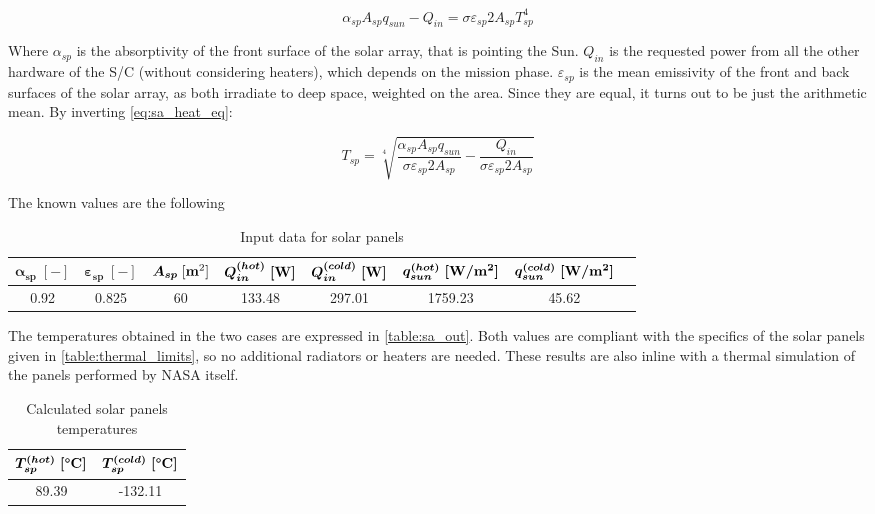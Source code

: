 \begin{equation}
    \alpha_{sp}A_{sp} q_{sun} - Q_{in} = \sigma \varepsilon_{sp} 2 A_{sp} T_{sp}^4
    \label{eq:sa_heat_eq}
\end{equation}

Where $\alpha_{sp}$ is the absorptivity of the front surface of the solar array, that is pointing the Sun. $Q_{in}$ is the requested power from all the other hardware of the S/C (without considering heaters), which depends on the mission phase. $\varepsilon_{sp}$ is the mean emissivity of the front and back surfaces of the solar array, as both irradiate to deep space, weighted on the area. Since they are equal, it turns out to be just the arithmetic mean. 
By inverting \autoref{eq:sa_heat_eq}:

\begin{equation}
    T_{sp} = \sqrt [4] {\frac{\alpha_{sp}A_{sp} q_{sun}}{\sigma  \varepsilon_{sp}2 A_{sp}} - \frac{Q_{in}}{\sigma \varepsilon_{sp}2 A_{sp}}}
\end{equation}

The known values are the following

\begin{table}[H]
    \renewcommand{\arraystretch}{1.5}
    \centering
    \begin{tabular}{|c|c|c|c|c|c|c|c|}
        \hline
        $\boldsymbol{\alpha_{sp} \; [-]}$ & $\boldsymbol{\varepsilon_{sp} \; [-]}$ & $\boldsymbol{A_{sp}}\;[\textrm{\textbf{m}}^2]$ & $\boldsymbol{Q_{in}^{(hot)} \; [\textrm{\textbf{W}}]}$ & $\boldsymbol{Q_{in}^{(cold)} \; [\textrm{\textbf{W}}]}$ & $\boldsymbol{q_{sun}^{(hot)} \; [\textrm{\textbf{W}}/\textrm{\textbf{m}}^2]}$ & $\boldsymbol{q_{sun}^{(cold)} \; [\textrm{\textbf{W}}/\textrm{\textbf{m}}^2]}$ \\
        \hline
        \hline
        0.92 & 0.825 & 60 &  133.48 & 297.01 & 1759.23 & 45.62 \\
        \hline
    \end{tabular}
    \caption{Input data for solar panels}
    \label{table:sa_data}
\end{table}

\vspace*{-3mm}

The temperatures obtained in the two cases are expressed in \autoref{table:sa_out}. 
Both values are compliant with the specifics of the solar panels given in \autoref{table:thermal_limits}, so no additional radiators or heaters are needed. These results are also inline with a thermal simulation of the panels performed by NASA itself. \cite{solar_panels_coef}

\begin{table}[H]
    \renewcommand{\arraystretch}{1.5}
    \centering
    \begin{tabular}{|c|c|}
        \hline
        $\boldsymbol{T_{sp}^{(hot)} \; [\textrm{\textbf{°C}}]}$ & $\boldsymbol{T_{sp}^{(cold)} \; [\textrm{\textbf{°C}}]}$ \\
        \hline
        \hline
        89.39 & -132.11 \\
        \hline
    \end{tabular}
    \caption{Calculated solar panels temperatures}
    \label{table:sa_out}
\end{table}